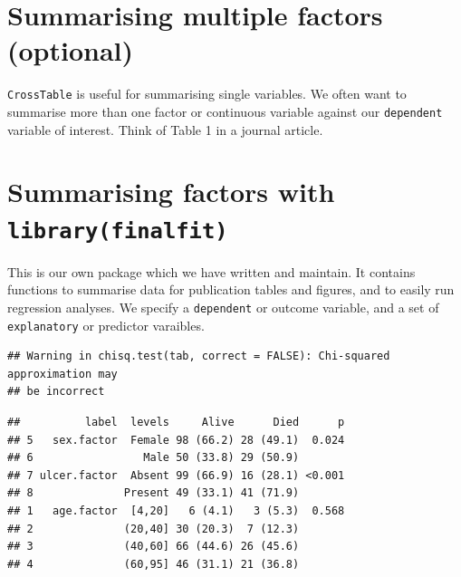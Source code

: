 \documentclass[12pt,]{krantz}
\makeatletter
\newenvironment{Shaded}{\begin{snugshade}}{\end{snugshade}}
\newcommand{\DataTypeTok}[1]{\textcolor[rgb]{0.13,0.29,0.53}{#1}}
\newcommand{\KeywordTok}[1]{\textcolor[rgb]{0.13,0.29,0.53}{\textbf{#1}}}
\newcommand{\NormalTok}[1]{#1}
\newcommand{\OperatorTok}[1]{\textcolor[rgb]{0.81,0.36,0.00}{\textbf{#1}}}
\newcommand{\OtherTok}[1]{\textcolor[rgb]{0.56,0.35,0.01}{#1}}
\newcommand{\StringTok}[1]{\textcolor[rgb]{0.31,0.60,0.02}{#1}}
\newenvironment{kframe}{%
\medskip{}
\setlength{\fboxsep}{.8em}
 \def\at@end@of@kframe{}%
 \ifinner\ifhmode%
  \def\at@end@of@kframe{\end{minipage}}%
  \begin{minipage}{\columnwidth}%
 \fi\fi%
 \def\FrameCommand##1{\hskip\@totalleftmargin \hskip-\fboxsep
 \colorbox{shadecolor}{##1}\hskip-\fboxsep
     \hskip-\linewidth \hskip-\@totalleftmargin \hskip\columnwidth}%
 \MakeFramed {\advance\hsize-\width
   \@totalleftmargin\z@ \linewidth\hsize
   \@setminipage}}%
 {\par\unskip\endMakeFramed%
 \at@end@of@kframe}
\renewenvironment{Shaded}{\begin{kframe}}{\end{kframe}}
\theoremstyle{definition}
\theoremstyle{definition}
\theoremstyle{definition}
\theoremstyle{remark}
\makeatother
\begin{document}
\hypertarget{summarising-multiple-factors-optional}{%
\section{Summarising multiple factors
(optional)}\label{summarising-multiple-factors-optional}}

\texttt{CrossTable} is useful for summarising single variables. We often
want to summarise more than one factor or continuous variable against
our \texttt{dependent} variable of interest. Think of Table 1 in a
journal article.

\hypertarget{summarising-factors-with-libraryfinalfit}{%
\section{\texorpdfstring{Summarising factors with
\texttt{library(finalfit)}}{Summarising factors with library(finalfit)}}\label{summarising-factors-with-libraryfinalfit}}

This is our own package which we have written and maintain. It contains
functions to summarise data for publication tables and figures, and to
easily run regression analyses. We specify a \texttt{dependent} or
outcome variable, and a set of \texttt{explanatory} or predictor
varaibles.

\begin{Shaded}
\end{Shaded}

\begin{verbatim}
## Warning in chisq.test(tab, correct = FALSE): Chi-squared approximation may
## be incorrect
\end{verbatim}

\begin{verbatim}
##          label  levels     Alive      Died      p
## 5   sex.factor  Female 98 (66.2) 28 (49.1)  0.024
## 6                 Male 50 (33.8) 29 (50.9)       
## 7 ulcer.factor  Absent 99 (66.9) 16 (28.1) <0.001
## 8              Present 49 (33.1) 41 (71.9)       
## 1   age.factor  [4,20]   6 (4.1)   3 (5.3)  0.568
## 2              (20,40] 30 (20.3)  7 (12.3)       
## 3              (40,60] 66 (44.6) 26 (45.6)       
## 4              (60,95] 46 (31.1) 21 (36.8)
\end{verbatim}
\end{document}
